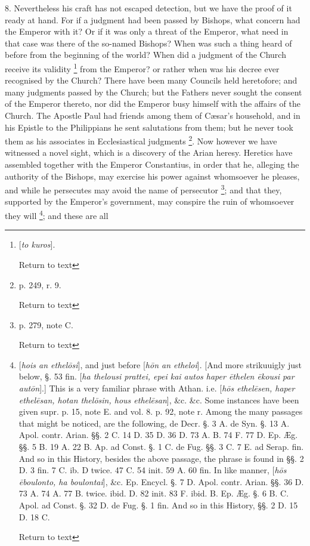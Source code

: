 8. Nevertheless his craft has not escaped
detection, but we have the proof of it ready at hand. For if a
judgment had been passed by Bishops, what concern had the
Emperor with it? Or if it was only a threat of the Emperor, what need
in that case was there of the so-named Bishops? When was such a thing
heard of before from the beginning of the world? When did a judgment
of the Church receive its validity \footnote{[\emph{to kuros}].

Return to text} from the Emperor? or
rather when was his decree ever recognised by the Church? There have
been many Councils held heretofore; and many judgments passed by the
Church; but the Fathers never sought the consent of the Emperor
thereto, nor did the Emperor busy himself with the affairs of the
Church. The Apostle Paul had friends among them of Cæsar's
household, and in his Epistle to the Philippians he sent salutations
from them; but he never took them as his associates in Ecclesiastical
judgments \footnote{p. 249, r. 9.

Return to text}. Now however we have witnessed a novel sight,
which is a discovery of the Arian heresy. Heretics have assembled
together with the Emperor Constantius, in order that he, alleging the
authority of the Bishops, may exercise his power against whomsoever he
pleases, and while he persecutes may avoid the name of persecutor \footnote{p. 279, note C.

Return to text}; and that they, supported by the Emperor's government, may
conspire the ruin of whomsoever they will \footnote{[\emph{hois an ethel\={o}si}], and just
before [\emph{h\={o}n an etheloi}]. [And more strikuuigly just
below, §. 53 fin. [\emph{ha thelousi prattei, epei kai autos haper \={e}thelen
\={e}kousi par aut\={o}n}].] This is a very familiar phrase
with Athan. i.e. [\emph{h\={o}s ethel\={e}sen, haper ethel\={e}san,
hotan thel\={o}sin, hous ethel\={e}san}], \&c. \&c.
Some instances have been given supr. p. 15, note E. and vol. 8. p. 92,
note r. Among the many passages that might be noticed, are the
following, de Decr. §. 3 A. de Syn. §. 13 A. Apol. contr. Arian.
§§. 2 C. 14 D. 35 D. 36 D. 73 A. B. 74 F. 77 D. Ep. Æg. §§. 5 B.
19 A. 22 B. Ap. ad Const. §. 1 C. de Fug. §§. 3 C. 7 E. ad Serap.
fin. And so in this History, besides the above passage, the phrase is
found in §§. 2 D. 3 fin. 7 C. ib. D twice. 47 C. 54 init. 59 A. 60
fin. In like manner, [\emph{h\={o}s \={e}boulonto, ha boulontai}],
\&c. Ep. Encycl. §. 7 D. Apol. contr. Arian. §§. 36 D. 73 A. 74
A. 77 B. twice. ibid. D. 82 init. 83 F. ibid. B. Ep. Æg. §. 6 B. C.
Apol. ad Const. §. 32 D. de Fug. §. 1 fin. And so in this History,
§§. 2 D. 15 D. 18 C.

Return to text}; and these are all
